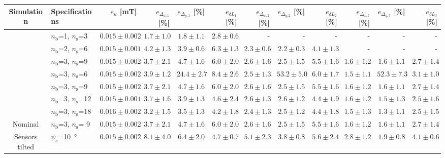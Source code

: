 \begin{table}
\begin{tabular}{cl r rrr rrr rrr}\toprule
\textbf{Simulation} & \textbf{Specifications} & $e_{u}$ [mT] & $e_{\Delta_{x,1}}$ [\%] & $e_{\Delta_{y,1}}$ [\%] & $e_{\delta L_1}$ [\%] & $e_{\Delta_{x,2}}$ [\%] & $e_{\Delta_{y,2}}$ [\%] & $e_{\delta L_2}$ [\%] & $e_{\Delta_{x,3}}$ [\%] & $e_{\Delta_{y,3}}$ [\%] & $e_{\delta L_3}$ [\%]\\
\midrule
{} & $n_\mathrm{b}$=1, $n_\mathrm{s}$=3 & $0.015 \pm 0.002$ & $1.7 \pm 1.0$ & $1.8 \pm 1.1$ & $2.8 \pm 0.6$ & - & - & - & - & - & -\\
& $n_\mathrm{b}$=2, $n_\mathrm{s}$=6 & $0.015 \pm 0.001$ & $4.2 \pm 1.3$ & $3.9 \pm 0.6$ & $6.3 \pm 1.3$ & $2.3 \pm 0.6$ & $2.2 \pm 0.3$ & $4.1 \pm 1.3$ & - & - & -\\
& $n_\mathrm{b}$=3, $n_\mathrm{s}$=9 & $0.015 \pm 0.002$ & $3.7 \pm 2.1$ & $4.7 \pm 1.6$ & $6.0 \pm 2.0$ & $2.6 \pm 1.6$ & $2.5 \pm 1.5$ & $5.5 \pm 1.6$ & $1.6 \pm 1.2$ & $1.6 \pm 1.1$ & $2.7 \pm 1.4$\\
\midrule
{} &$n_\mathrm{b}$=3, $n_\mathrm{s}$=6 & $0.015 \pm 0.002$ & $3.9 \pm 1.2$ & $24.4 \pm 2.7$ & $8.4 \pm 2.6$ & $2.5 \pm 1.3$ & $53.2 \pm 5.0$ & $6.0 \pm 1.7$ & $1.5 \pm 1.1$ & $52.3 \pm 7.3$ & $3.1 \pm 1.0$\\
&$n_\mathrm{b}$=3, $n_\mathrm{s}$=9 & $0.015 \pm 0.002$ & $3.7 \pm 2.1$ & $4.7 \pm 1.6$ & $6.0 \pm 2.0$ & $2.6 \pm 1.6$ & $2.5 \pm 1.5$ & $5.5 \pm 1.6$ & $1.6 \pm 1.2$ & $1.6 \pm 1.1$ & $2.7 \pm 1.4$\\
&$n_\mathrm{b}$=3, $n_\mathrm{s}$=12 & $0.015 \pm 0.001$ & $3.7 \pm 1.6$ & $3.9 \pm 1.3$ & $4.6 \pm 2.4$ & $2.6 \pm 1.3$ & $2.6 \pm 1.2$ & $4.4 \pm 1.9$ & $1.6 \pm 1.2$ & $1.5 \pm 1.3$ & $2.5 \pm 1.6$\\
&$n_\mathrm{b}$=3, $n_\mathrm{s}$=18 & $0.016 \pm 0.002$ & $3.2 \pm 1.5$ & $3.5 \pm 1.3$ & $4.2 \pm 1.8$ & $2.4 \pm 1.3$ & $2.5 \pm 1.2$ & $4.4 \pm 1.8$ & $1.5 \pm 1.3$ & $1.3 \pm 1.1$ & $2.5 \pm 1.5$\\
\midrule
Nominal & $n_\mathrm{b}$=3, $n_\mathrm{s}$= 9 & $0.015 \pm 0.002$ & $3.7 \pm 2.1$ & $4.7 \pm 1.6$ & $6.0 \pm 2.0$ & $2.6 \pm 1.6$ & $2.5 \pm 1.5$ & $5.5 \pm 1.6$ & $1.6 \pm 1.2$ & $1.6 \pm 1.1$ & $2.7 \pm 1.4$\\
Sensors tilted & $\psi_\mathrm{s}$=\SI{10}{\degree} & $0.015 \pm 0.002$ & $8.1 \pm 4.0$ & $6.4 \pm 2.0$ & $4.7 \pm 0.7$ & $5.1 \pm 2.3$ & $3.8 \pm 0.8$ & $5.6 \pm 2.4$ & $2.8 \pm 1.2$ & $1.9 \pm 0.8$ & $4.1 \pm 0.6$\\

\end{tabular}
\end{table}
